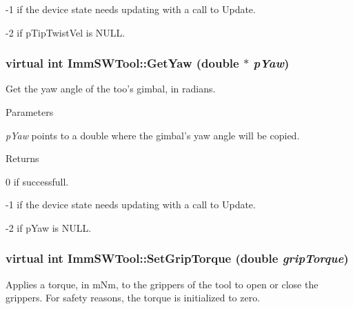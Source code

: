 -\/1 if the device state needs updating with a call to Update.

-\/2 if pTipTwistVel is NULL. \hypertarget{classImmSWTool_a1f6c1a17ab9adf4dc6ee5fbb7587887e}{
\subsubsection[{GetYaw}]{\setlength{\rightskip}{0pt plus 5cm}virtual int ImmSWTool::GetYaw (double $\ast$ {\em pYaw})}}
\label{classImmSWTool_a1f6c1a17ab9adf4dc6ee5fbb7587887e}
Get the yaw angle of the too's gimbal, in radians.


\begin{DoxyParams}{Parameters}
\item[{\em pYaw}]points to a double where the gimbal's yaw angle will be copied.\end{DoxyParams}
\begin{DoxyReturn}{Returns}

\end{DoxyReturn}
0 if successfull.

-\/1 if the device state needs updating with a call to Update.

-\/2 if pYaw is NULL. \hypertarget{classImmSWTool_acec85d7293923fd5acf507da0788ee15}{
\subsubsection[{SetGripTorque}]{\setlength{\rightskip}{0pt plus 5cm}virtual int ImmSWTool::SetGripTorque (double {\em gripTorque})}}
\label{classImmSWTool_acec85d7293923fd5acf507da0788ee15}
Applies a torque, in mNm, to the grippers of the tool to open or close the grippers. For safety reasons, the torque is initialized to zero.


